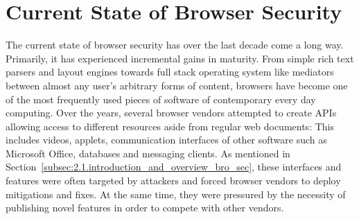 % 
% 
% 
% 
% 

  \section{Current State of Browser Security}
  \label{subsec:2.4.the_history_of_browser_security}

    The current state of browser security has over the last decade come a long way. Primarily, it has experienced incremental gains in maturity. From simple rich text parsers and layout engines towards full stack operating system like mediators between almost any user's arbitrary forms of content, browsers have become one of the most frequently used pieces of software of contemporary every day computing. Over the years, several browser vendors attempted to create APIs allowing access to different resources aside from regular web documents: This includes videos, applets, communication interfaces of other software such as Microsoft Office, databases and messaging clients. As mentioned in Section~\ref{subsec:2.1.introduction_and_overview_bro_sec}, these interfaces and features were often targeted by attackers and forced browser vendors to deploy mitigations and fixes. At the same time, they were pressured by the necessity of publishing novel features in order to compete with other vendors. \\

